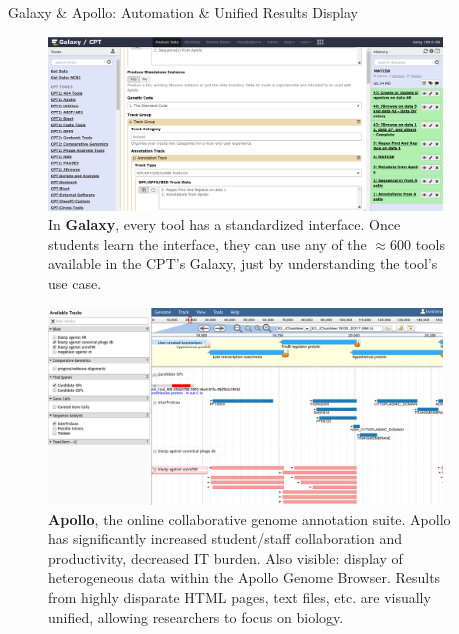 \documentclass[final,t,20pt]{beamer}
\begin{document}
\begin{frame}[fragile]
\begin{columns}[t]
\begin{column}{.36\linewidth}
        \end{column}
        \begin{column}{.60\linewidth}
            \begin{block}{Galaxy \& Apollo: Automation \& Unified Results Display }
                \begin{figure}
                    \includegraphics[width=0.98\textwidth]{./media/galaxy.png}
                    \caption{In \textbf{Galaxy}, every tool has a standardized
                        interface. Once students learn the interface, they can
                        use any of the $\approx$600 tools available in the
                        CPT's Galaxy, just by understanding the tool's use case.}
                \end{figure}
                \begin{figure}
                    \includegraphics[width=0.98\textwidth]{./media/apollo.png}
                    \caption{\textbf{Apollo}, the online collaborative genome annotation
                    suite. Apollo has significantly increased student/staff
                    collaboration and productivity, decreased IT burden.
                    Also visible: display of heterogeneous data within the Apollo
                    Genome Browser. Results from highly disparate HTML pages,
                    text files, etc. are visually unified, allowing researchers to
                    focus on biology.}
                \end{figure}


\end{block}
\end{column}
\end{columns}
\end{frame}
\end{document}
